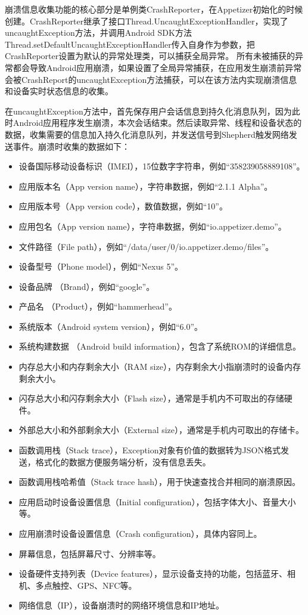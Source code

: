 崩溃信息收集功能的核心部分是单例类CrashReporter，在Appetizer初始化的时候创建。CrashReporter继承了接口Thread.UncaughtExceptionHandler，实现了uncaughtException方法，并调用Android SDK方法Thread.setDefaultUncaughtExceptionHandler传入自身作为参数，把CrashReporter设置为默认的异常处理类，可以捕获全局异常。
所有未被捕获的异常都会导致Android应用崩溃，如果设置了全局异常捕获，在应用发生崩溃前异常会被CrashReport的uncaughtException方法捕获，可以在该方法内实现崩溃信息和设备实时状态信息的收集。

在uncaughtException方法中，首先保存用户会话信息到持久化消息队列，因为此时Android应用程序发生崩溃，本次会话结束。然后读取异常、线程和设备状态的数据，收集需要的信息加入持久化消息队列，并发送信号到Shepherd触发网络发送事件。崩溃时收集的数据如下：

 \begin{itemize}
 	\item 设备国际移动设备标识（IMEI），15位数字字符串，例如“358239058889108”。
 	\item 应用版本名（App version name），字符串数据，例如“2.1.1 Alpha”。
 	\item 应用版本号（App version code），数值数据，例如“10”。
 	\item 应用包名（App version name），字符串数据，例如“io.appetizer.demo”。
 	\item 文件路径（File path），例如“/data/user/0/io.appetizer.demo/files”。
 	\item 设备型号（Phone model），例如“Nexus 5”。
 	\item 设备品牌 （Brand），例如“google”。
 	\item 产品名 （Product），例如“hammerhead”。
 	\item 系统版本（Android system version），例如“6.0”。
 	\item 系统构建数据 （Android build information），包含了系统ROM的详细信息。
 	\item 内存总大小和内存剩余大小（RAM size），内存剩余大小指崩溃时的设备内存剩余大小。
 	\item 闪存总大小和闪存剩余大小（Flash size），通常是手机内不可取出的存储硬件。
 	\item 外部总大小和外部剩余大小（External size），通常是手机内可取出的存储卡。
 	\item 函数调用栈（Stack trace），Exception对象有价值的数据转为JSON格式发送，格式化的数据方便服务端分析，没有信息丢失。
 	\item 函数调用栈哈希值（Stack trace hash），用于快速查找合并相同的崩溃原因。
 	\item 应用启动时设备设置信息（Initial configuration），包括字体大小、音量大小等。
 	\item 应用崩溃时设备设置信息（Crash configuration），具体内容同上。
 	\item 屏幕信息，包括屏幕尺寸、分辨率等。
 	\item 设备硬件支持列表（Device features），显示设备支持的功能，包括蓝牙、相机、多点触控、GPS、NFC等。
 	\item 网络信息（IP），设备崩溃时的网络环境信息和IP地址。
 \end{itemize}
 
